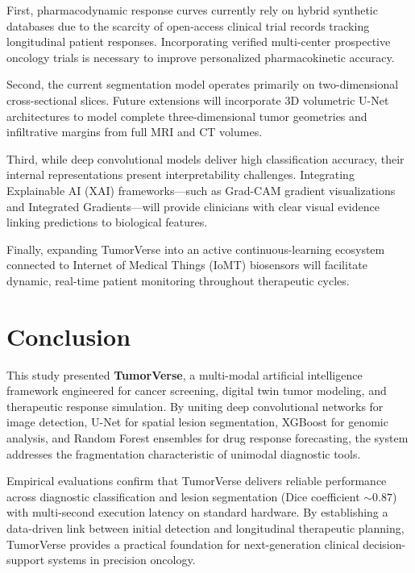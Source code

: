 \documentclass[conference]{IEEEtran}
\begin{document}
First, pharmacodynamic response curves currently rely on hybrid synthetic databases due to the scarcity of open-access clinical trial records tracking longitudinal patient responses. Incorporating verified multi-center prospective oncology trials is necessary to improve personalized pharmacokinetic accuracy.

Second, the current segmentation model operates primarily on two-dimensional cross-sectional slices. Future extensions will incorporate 3D volumetric U-Net architectures to model complete three-dimensional tumor geometries and infiltrative margins from full MRI and CT volumes.

Third, while deep convolutional models deliver high classification accuracy, their internal representations present interpretability challenges. Integrating Explainable AI (XAI) frameworks---such as Grad-CAM gradient visualizations and Integrated Gradients---will provide clinicians with clear visual evidence linking predictions to biological features.

Finally, expanding TumorVerse into an active continuous-learning ecosystem connected to Internet of Medical Things (IoMT) biosensors will facilitate dynamic, real-time patient monitoring throughout therapeutic cycles.

\section{Conclusion}
This study presented \textbf{TumorVerse}, a multi-modal artificial intelligence framework engineered for cancer screening, digital twin tumor modeling, and therapeutic response simulation. By uniting deep convolutional networks for image detection, U-Net for spatial lesion segmentation, XGBoost for genomic analysis, and Random Forest ensembles for drug response forecasting, the system addresses the fragmentation characteristic of unimodal diagnostic tools.

Empirical evaluations confirm that TumorVerse delivers reliable performance across diagnostic classification and lesion segmentation (Dice coefficient $\sim 0.87$) with multi-second execution latency on standard hardware. By establishing a data-driven link between initial detection and longitudinal therapeutic planning, TumorVerse provides a practical foundation for next-generation clinical decision-support systems in precision oncology.
\end{document}
